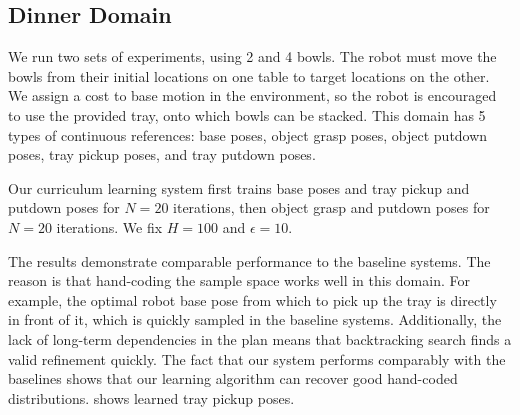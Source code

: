 \subsection{Dinner Domain}
We run two sets of experiments, using 2 and 4 bowls. The robot must move the
bowls from their initial locations on one table to target locations on the other. We assign a cost to
base motion in the environment, so the robot is encouraged to use the provided tray, onto which bowls can be stacked.
This domain has 5 types of continuous references: base poses, object grasp poses, object putdown poses, tray pickup
poses, and tray putdown poses.

Our curriculum learning system first trains base poses and tray pickup and putdown poses for
$N = 20$ iterations, then object grasp and putdown poses for $N = 20$ iterations. We fix $H = 100$ and $\epsilon = 10$.

The results demonstrate comparable performance to the baseline systems. The reason is that
hand-coding the sample space works well in this domain. For example, the optimal
robot base pose from which to pick up the tray is directly in front of it, which is quickly sampled in
the baseline systems. Additionally, the lack of long-term dependencies in the plan
means that backtracking search finds a valid refinement quickly. The fact that our system performs comparably
with the baselines shows that our learning algorithm can recover good hand-coded distributions.
 shows learned tray pickup poses.

